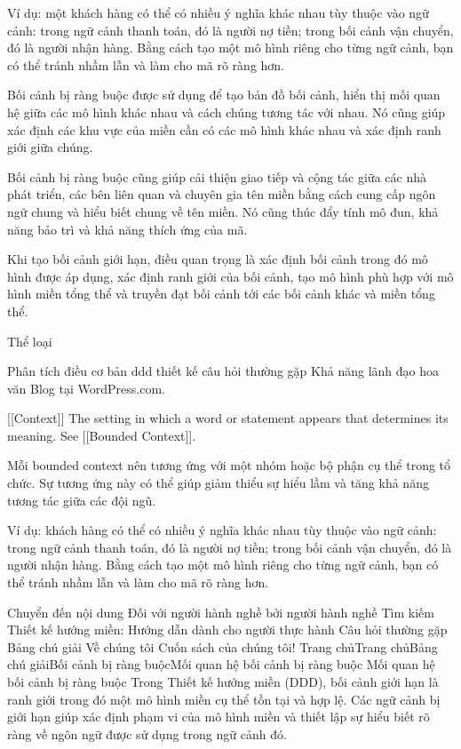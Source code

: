 Ví dụ: một khách hàng có thể có nhiều ý nghĩa khác nhau tùy thuộc vào ngữ cảnh: trong ngữ cảnh thanh toán, đó là người nợ tiền; trong bối cảnh vận chuyển, đó là người nhận hàng. Bằng cách tạo một mô hình riêng cho từng ngữ cảnh, bạn có thể tránh nhầm lẫn và làm cho mã rõ ràng hơn.

Bối cảnh bị ràng buộc được sử dụng để tạo bản đồ bối cảnh, hiển thị mối quan hệ giữa các mô hình khác nhau và cách chúng tương tác với nhau. Nó cũng giúp xác định các khu vực của miền cần có các mô hình khác nhau và xác định ranh giới giữa chúng.

Bối cảnh bị ràng buộc cũng giúp cải thiện giao tiếp và cộng tác giữa các nhà phát triển, các bên liên quan và chuyên gia tên miền bằng cách cung cấp ngôn ngữ chung và hiểu biết chung về tên miền. Nó cũng thúc đẩy tính mô đun, khả năng bảo trì và khả năng thích ứng của mã.

Khi tạo bối cảnh giới hạn, điều quan trọng là xác định bối cảnh trong đó mô hình được áp dụng, xác định ranh giới của bối cảnh, tạo mô hình phù hợp với mô hình miền tổng thể và truyền đạt bối cảnh tới các bối cảnh khác và miền tổng thể.


Thể loại

Phân tích
điều cơ bản
ddd
thiết kế
câu hỏi thường gặp
Khả năng lãnh đạo
hoa văn
Blog tại WordPress.com.

[[Context]] The setting in which a word or statement appears that determines its meaning. See [[Bounded Context]].

Mỗi bounded context nên tương ứng với một nhóm hoặc bộ phận cụ thể trong tổ chức. Sự tương ứng này có thể giúp giảm thiểu sự hiểu lầm và tăng khả năng tương tác giữa các đội ngũ.

Ví dụ: khách hàng có thể có nhiều ý nghĩa khác nhau tùy thuộc vào ngữ cảnh: trong ngữ cảnh thanh toán, đó là người nợ tiền; trong bối cảnh vận chuyển, đó là người nhận hàng. Bằng cách tạo một mô hình riêng cho từng ngữ cảnh, bạn có thể tránh nhầm lẫn và làm cho mã rõ ràng hơn.


Chuyển đến nội dung
Đối với người hành nghề bởi người hành nghề
Tìm kiếm
Thiết kế hướng miền: Hướng dẫn dành cho người thực hành
Câu hỏi thường gặp
Bảng chú giải
Về chúng tôi
Cuốn sách của chúng tôi!
Trang chủTrang chủBảng chú giảiBối cảnh bị ràng buộcMối quan hệ bối cảnh bị ràng buộc
Mối quan hệ bối cảnh bị ràng buộc
Trong Thiết kế hướng miền (DDD), bối cảnh giới hạn là ranh giới trong đó một mô hình miền cụ thể tồn tại và hợp lệ. Các ngữ cảnh bị giới hạn giúp xác định phạm vi của mô hình miền và thiết lập sự hiểu biết rõ ràng về ngôn ngữ được sử dụng trong ngữ cảnh đó.

